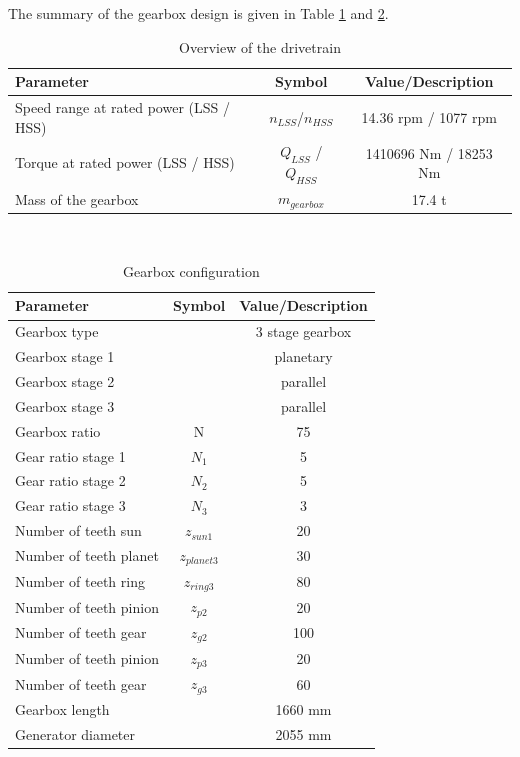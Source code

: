 The summary of the gearbox design is given in Table \ref{tab:overview_drivetrain} and \ref{tab:gearbox_config}. 

\begin{table}[h]
\centering
\caption{Overview of the drivetrain}
\label{tab:overview_drivetrain}
\begin{tabular}{ |l|c|c| } 
\hline
\textbf{Parameter} & \textbf{Symbol} & \textbf{Value/Description}\\ 
\hline
Speed range at rated power (LSS / HSS) & $n_{LSS}$/$n_{HSS}$&  14.36 rpm / 1077 rpm \\ 
\hline
Torque at rated power (LSS / HSS) & $Q_{LSS}$ / $Q_{HSS}$ & 1410696 Nm / 18253 Nm\\
\hline
Mass of the gearbox & $m_{gearbox}$ & 17.4 t\\
\hline
\end{tabular} \\
\end{table}

\begin{table}[h]
\centering
\caption{Gearbox configuration}
\label{tab:gearbox_config}
\begin{tabular}{ |l|c|c| } 
\hline
\textbf{Parameter} & \textbf{Symbol} & \textbf{Value/Description}\\ 
\hline
Gearbox type & & 3 stage gearbox\\
\hline
Gearbox stage 1 & & planetary\\
\hline
Gearbox stage 2 & & parallel\\
\hline
Gearbox stage 3 & & parallel\\
\hline
Gearbox ratio & N & 75 \\
\hline
Gear ratio stage 1 & $N_1$ & 5\\
\hline
Gear ratio stage 2 & $N_2$ & 5\\
\hline
Gear ratio stage 3 & $N_3$ & 3\\
\hline
Number of teeth sun& $z_{sun1}$ & 20\\
\hline
Number of teeth planet& $z_{planet3}$ & 30\\
\hline
Number of teeth ring& $z_{ring3}$ & 80\\
\hline
Number of teeth pinion& $z_{p2}$ & 20\\
\hline
Number of teeth gear& $z_{g2}$ & 100\\
\hline
Number of teeth pinion& $z_{p3}$ & 20\\
\hline
Number of teeth gear& $z_{g3}$ & 60\\
\hline
Gearbox length& & 1660 mm\\
\hline
Generator diameter& & 2055 mm\\
\hline
\end{tabular} \\
\end{table}

